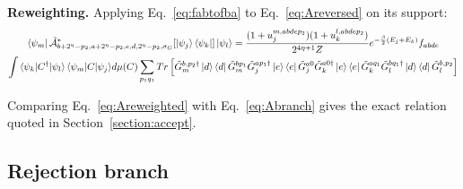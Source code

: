 \documentclass[aps,floatfix,10pt,amssymb,amsfont,amsmath,superscriptaddress,float,nofootinbib,longbibliography,nobalancelastpage,twocolumn]{revtex4-2}
\begin{document}
\smallskip
\noindent\textbf{Reweighting.} Applying Eq.~\eqref{eq:fabtofba} to Eq.~\eqref{eq:Areversed} on its support:
\begin{multline}
\bra{\psi_m}\tilde{\mathcal{A}}^*_{b+2^{\eta}-p_2,a+2^{\eta}-p_2,e,d,2^{\eta}-p_2,\sigma_G}[\ket{\psi_j}\bra{\psi_k}]\ket{\psi_l} 
   = \frac{(1+u_j^{m,abdep_2})(1+u_k^{l,abdep_2})}{2^{4\eta+1}Z}   e^{-\frac{\beta}{2}(E_j+E_k)}{f_{abde}}  \\\int {\braket{\psi_k|C^{\dagger}|\psi_l}\braket{\psi_m|C|\psi_j}} d\mu(C)\sum_{p_1q_1}Tr\left[ {\tilde G_m^{b, p_2\dagger}\ket{d}\bra{d}\tilde G_m^{bp_1}} {\tilde G^{ap_1\dagger}_j\ket{e}\bra{e}\tilde G^{a0}_j } \tilde G^{a0\dagger}_k\ket{e}\bra{e}\tilde G^{aq_1}_k \tilde G_l^{bq_1\dagger}\ket{d}\bra{d}\tilde G_l^{b,p_2}\right]
\label{eq:Areweighted}
\end{multline}

Comparing Eq.~\eqref{eq:Areweighted} with Eq.~\eqref{eq:Abranch} gives the exact relation quoted in Section~\ref{section:accept}.

\subsection{Rejection branch}
\end{document}
